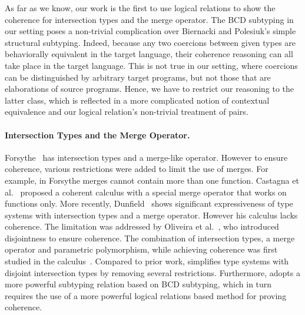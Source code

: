 As far as we know, our work is the first to use logical relations
to show the coherence for intersection types and the merge operator. The BCD
subtyping in our setting poses a non-trivial complication over Biernacki and
Polesiuk's simple structural subtyping. Indeed, because any two coercions
between given types are behaviorally equivalent in the target language, their
coherence reasoning can all take place in the target language. This is not true
in our setting, where coercions can be distinguished by arbitrary target
programs, but not those that are elaborations of source programs. Hence, we have to
restrict our reasoning to the latter class, which is reflected in a more
complicated notion of contextual equivalence and our logical relation's
non-trivial treatment of pairs.

\paragraph{Intersection Types and the Merge Operator.}
Forsythe~\citep{reynolds1988preliminary} has intersection types and a merge-like operator. However to ensure coherence, various
restrictions were added to limit the use of merges. For example, in Forsythe
merges cannot contain more than one function. Castagna et al.~\citep{Castagna_1992} proposed a
coherent calculus with a special merge operator that works on functions only.
More recently, Dunfield~\citep{dunfield2014elaborating} shows significant expressiveness
of type systems with intersection types and a merge operator. However his
calculus lacks coherence. The limitation was addressed by
Oliveira et al.~\citep{oliveira2016disjoint}, who introduced disjointness to ensure
coherence. The combination of intersection types, a merge operator and
parametric polymorphism, while achieving coherence was first studied in the
\fname calculus~\citep{alpuimdisjoint}. Compared to prior work, \name simplifies type systems
with disjoint intersection types by removing several restrictions. 
Furthermore, \name adopts a more powerful subtyping relation based 
on BCD subtyping, which in turn requires the use of a more powerful
logical relations based method for proving coherence.




